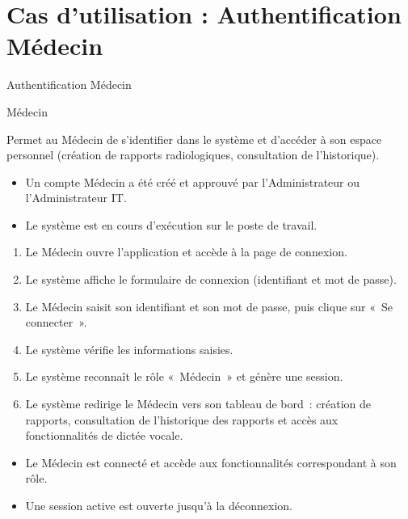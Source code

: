 \documentclass[11pt]{article}
\begin{document}
\section*{Cas d'utilisation : Authentification Médecin}

\begin{description}[leftmargin=4.2cm, style=nextline]
    \item[Titre de cas d'utilisation] Authentification Médecin

    \item[Acteur principal] Médecin

    \item[Description] Permet au Médecin de s'identifier dans le système
    et d'accéder à son espace personnel (création de rapports radiologiques,
    consultation de l'historique).

    \item[Préconditions]
    \begin{itemize}[leftmargin=*, nosep]
        \item Un compte Médecin a été créé et approuvé par l'Administrateur
              ou l'Administrateur IT.
        \item Le système est en cours d'exécution sur le poste de travail.
    \end{itemize}

    \item[Scénario principal]
    \begin{enumerate}[leftmargin=*, topsep=0pt, itemsep=0pt]
        \item Le Médecin ouvre l'application et accède à la page de connexion.
        \item Le système affiche le formulaire de connexion (identifiant et mot de passe).
        \item Le Médecin saisit son identifiant et son mot de passe, puis clique sur
              «~Se connecter~».
        \item Le système vérifie les informations saisies.
        \item Le système reconnaît le rôle «~Médecin~» et génère une session.
        \item Le système redirige le Médecin vers son tableau de bord~:
              création de rapports, consultation de l'historique des rapports
              et accès aux fonctionnalités de dictée vocale.
    \end{enumerate}

    \item[Postconditions]
    \begin{itemize}[leftmargin=*, nosep]
        \item Le Médecin est connecté et accède aux fonctionnalités
              correspondant à son rôle.
        \item Une session active est ouverte jusqu'à la déconnexion.
    \end{itemize}


\end{description}
\end{document}
